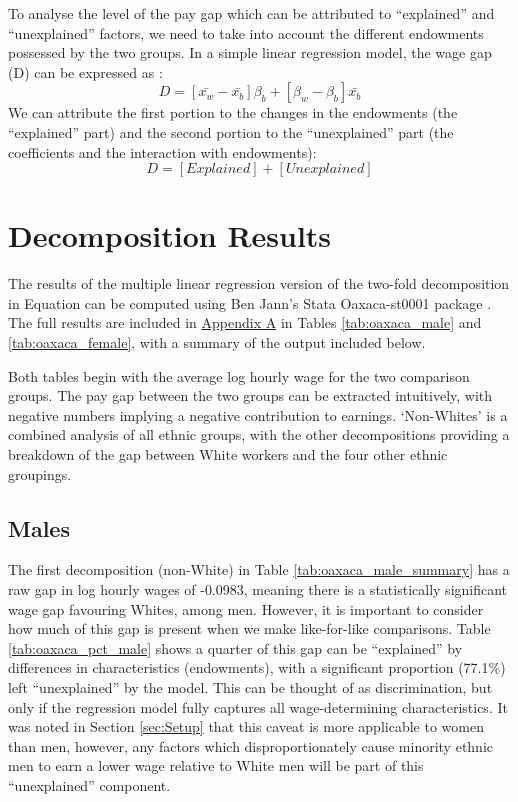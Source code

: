 \documentclass[class=article, crop=false]{standalone}
\begin{document}
To analyse the level of the pay gap which can be attributed to \enquote{explained} and \enquote{unexplained} factors, we need to take into account the different endowments possessed by the two groups. In a simple linear regression model, the wage gap (D) can be expressed as \citep{WB}:
\begin{equation}
  D = [\bar{x_{w}} - \bar{x_{b}}]\beta_{b} + [\beta_{w} - \beta_{b}]\bar{x_{b}}
  \label{eq:1}
\end{equation}
We can attribute the first portion to the changes in the endowments (the \enquote{explained} part) and the second portion to the \enquote{unexplained} part (the coefficients and the interaction with endowments):
\begin{equation}
  D = [Explained] + [Unexplained]
  \label{eq:2}
\end{equation}

\section{Decomposition Results}
\label{sec:Decomposition Results}
The results of the multiple linear regression version of the two-fold decomposition in Equation \label{eq:1} can be computed using Ben Jann's Stata Oaxaca-st0001 package \citep{Jann}. The full results are included in \hyperref[sec:appendixA]{Appendix A} in Tables \ref{tab:oaxaca_male} and \ref{tab:oaxaca_female}, with a summary of the output included below.

Both tables begin with the average log hourly wage for the two comparison groups. The pay gap between the two groups can be extracted intuitively, with negative numbers implying a negative contribution to earnings. \enquote*{Non-Whites} is a combined analysis of all ethnic groups, with the other decompositions providing a breakdown of the gap between White workers and the four other ethnic groupings.

\subsection{Males}
\label{sec:Males} %
The first decomposition (non-White) in Table \ref{tab:oaxaca_male_summary} has a raw gap in log hourly wages of -0.0983, meaning there is a statistically significant wage gap favouring Whites, among men. However, it is important to consider how much of this gap is present when we make like-for-like comparisons. Table \ref{tab:oaxaca_pct_male} shows a quarter of this gap can be \enquote{explained} by differences in characteristics (endowments), with a significant proportion (77.1\%) left \enquote{unexplained} by the model. This can be thought of as discrimination, but only if the regression model fully captures all wage-determining characteristics. It was noted in Section \ref{sec:Setup} that this caveat is more applicable to women than men, however, any factors which disproportionately cause minority ethnic men to earn a lower wage relative to White men will be part of this \enquote{unexplained} component.
\end{document}
